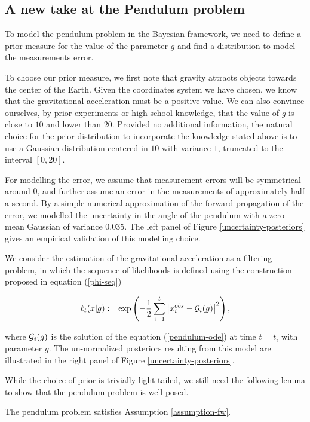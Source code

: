 \subsection{A new take at the Pendulum problem}

To model the pendulum problem in the Bayesian framework, we need to define a prior measure for the value of the parameter $g$ and find a distribution to model the measurements error.

To choose our prior measure, we first note that gravity attracts objects towards the center of the Earth. Given the coordinates system we have chosen, we know that the gravitational acceleration must be a positive value. We can also convince ourselves, by prior experiments or high-school knowledge, that the value of $g$ is close to $10$ and lower than $20$. Provided no additional information, the natural choice for the prior distribution to incorporate the knowledge stated above is to use a Gaussian distribution centered in $10$ with variance $1$, truncated to the interval $[0, 20]$.

For modelling the error, we assume that measurement errors will be symmetrical around $0$, and further assume an error in the measurements of approximately half a second. By a simple numerical approximation of the forward propagation of the error, we modelled the uncertainty in the angle of the pendulum with a zero-mean Gaussian of variance $0.035$. The left panel of Figure \ref{uncertainty-posteriors} gives an empirical validation of this modelling choice.

We consider the estimation of the gravitational acceleration as a filtering problem, in which the sequence of likelihoods is defined using the construction proposed in equation (\ref{phi-seq})

\begin{equation}\label{pendulum-weights}
  \ell_t(x|g) := \exp\left(-\frac12\sum_{i=1}^t\left|x^{obs}_i - \mathcal{G}_i(g)\right|^2\right),
\end{equation}

where $\mathcal{G}_i(g)$ is the solution of the equation (\ref{pendulum-ode}) at time $t = t_i$ with parameter $g$. The un-normalized posteriors resulting from this model are illustrated in the right panel of Figure \ref{uncertainty-posteriors}.

While the choice of prior is trivially light-tailed, we still need the following lemma to show that the pendulum problem is well-posed.

\begin{lemma} The pendulum problem satisfies Assumption \ref{assumption-fw}.
\end{lemma}



